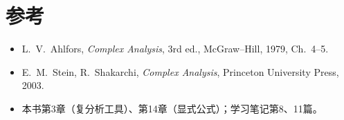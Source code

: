 \documentclass[11pt]{article}
\begin{document}
\section*{参考}
\begin{itemize}
 \item L.\ V.\ Ahlfors, \emph{Complex Analysis}, 3rd ed., McGraw--Hill, 1979, Ch.~4--5.
 \item E.\ M.\ Stein, R.\ Shakarchi, \emph{Complex Analysis}, Princeton University Press, 2003.
 \item 本书第3章（复分析工具）、第14章（显式公式）；学习笔记第8、11篇。
\end{itemize}
\end{document}

